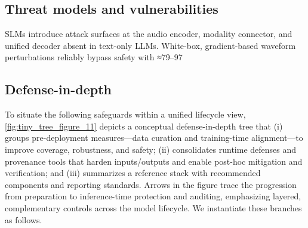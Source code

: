 \documentclass{article}
\begin{document}
\subsection{Threat models and vulnerabilities} \label{subsec:Threat models and vulnerabilities}
SLMs introduce attack surfaces at the audio encoder, modality connector, and unified decoder absent in text-only LLMs. White-box, gradient-based waveform perturbations reliably bypass safety with ≈79–97%

\subsection{Defense-in-depth} \label{subsec:Defense-in-depth}
To situate the following safeguards within a unified lifecycle view, \autoref{fig:tiny_tree_figure_11} depicts a conceptual defense-in-depth tree that (i) groups pre-deployment measures—data curation and training-time alignment—to improve coverage, robustness, and safety; (ii) consolidates runtime defenses and provenance tools that harden inputs/outputs and enable post-hoc mitigation and verification; and (iii) summarizes a reference stack with recommended components and reporting standards. Arrows in the figure trace the progression from preparation to inference-time protection and auditing, emphasizing layered, complementary controls across the model lifecycle. We instantiate these branches as follows.
\end{document}
